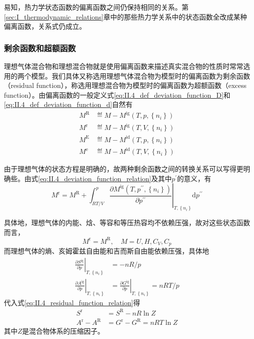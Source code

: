 \documentclass[main.tex]{subfiles}
\begin{document}
易知，热力学状态函数的偏离函数之间仍保持相同的关系。第\ref{sec:I_thermodynamic_relations}章中的那些热力学关系中的状态函数全改成某种偏离函数，关系式仍成立。

\subsubsection{剩余函数和超额函数}
理想气体混合物和理想混合物就是使用偏离函数来描述真实混合物的性质时常常选用的两个模型。我们具体又称选用理想气体混合物为模型时的偏离函数为剩余函数（residual function），称选用理想混合物为模型时的偏离函数为超额函数（excess function）。由偏离函数的一般定义式\eqref{eq:II.4_def_deviation_function_D}和\eqref{eq:II.4_def_deviation_function_d}自然有
\begin{align}
    M^\text{R} & \eqdef M-M^\text{ig}\left(T,p,\left\{n_i\right\}\right) \\
    M^\text{r} & \eqdef M-M^\text{ig}\left(T,V,\left\{n_i\right\}\right) \\
    M^\text{E} & \eqdef M-M^\text{id}\left(T,p,\left\{n_i\right\}\right) \\
    M^\text{e} & \eqdef M-M^\text{id}\left(T,V,\left\{n_i\right\}\right)
\end{align}

由于理想气体的状态方程是明确的，故两种剩余函数之间的转换关系可以写得更明确些。由式\eqref{eq:II.4_deviation_function_relation}及其中$p^\prime$的意义，有
\begin{equation}\label{eq:II.4_residual_function_relation}
    M^\text{r}=M^\text{R}+\int_{RT/V}^p\left.\frac{\partial M^\text{ig}\left(T,p^{\prime\prime},\left\{n_i\right\}\right)}{\partial p^{\prime\prime}}\right|_{T,\left\{n_i\right\}}\mathrm{d}p^{\prime\prime}
\end{equation}

具体地，理想气体的内能、焓、等容和等压热容均不依赖压强，故对这些状态函数而言，
\[M^\text{r}=M^\text{R},\quad M=U,H,C_V,C_p\]
而理想气体的熵、亥姆霍兹自由能和吉而斯自由能依赖压强，具体地
\begin{align*}
    \left.\frac{\partial S^\text{ig}}{\partial p}\right|_{T,\left\{n_i\right\}} & =-nR/p                                                                             \\
    \left.\frac{\partial A^\text{ig}}{\partial p}\right|_{T,\left\{n_i\right\}} & =\left.\frac{\partial G^\text{ig}}{\partial p}\right|_{T,\left\{n_i\right\}}=nRT/p
\end{align*}
代入式\eqref{eq:II.4_residual_function_relation}得
\begin{align*}
    S^\text{r}            & =S^\text{R}-nR\ln Z             \\
    A^\text{r}-A^\text{R} & =G^\text{r}-G^\text{R}=nRT\ln Z
\end{align*}
其中$Z$是混合物体系的压缩因子。
\end{document}
